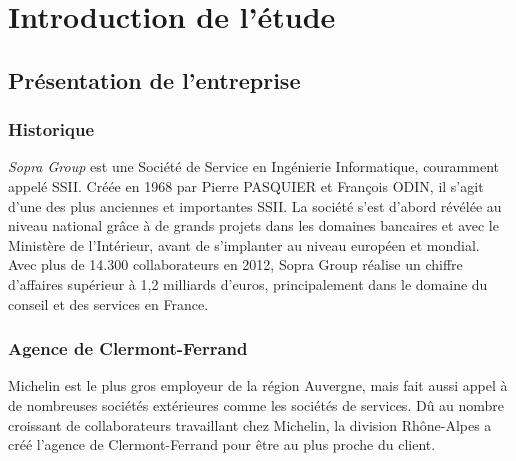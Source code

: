 \cleardoublepage

\chapter{Introduction de l'étude}


\section{Présentation de l'entreprise}


\subsection{Historique}

\textit{Sopra Group} est une Société de Service en Ingénierie Informatique, couramment appelé SSII.
Créée en 1968 par Pierre PASQUIER et François ODIN, il s'agit d'une des plus anciennes et importantes SSII.
La société s'est d'abord révélée au niveau national grâce à de grands projets dans les domaines bancaires et avec le Ministère de l'Intérieur, avant de s'implanter au niveau européen et mondial.
Avec plus de 14.300 collaborateurs en 2012, Sopra Group réalise un chiffre d'affaires supérieur à 1,2 milliards d'euros, principalement dans le domaine du conseil et des services en France.


\subsection{Agence de Clermont-Ferrand}

Michelin est le plus gros employeur de la région Auvergne, mais fait aussi appel à de nombreuses sociétés extérieures comme les sociétés de services.
Dû au nombre croissant de collaborateurs travaillant chez Michelin, la division Rhône-Alpes a créé l'agence de Clermont-Ferrand pour être au plus proche du client.

